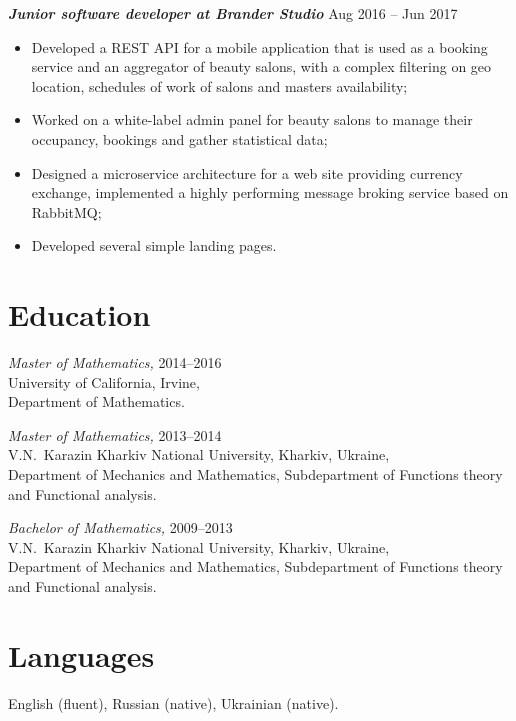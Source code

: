 \documentclass[margin, 10pt]{res} %
\begin{document}
\begin{resume}
{\sl \bf Junior software developer at Brander Studio} \hfill Aug 2016 -- Jun 2017
\begin{itemize}
 \item Developed a REST API  for a mobile application that is used as a booking service and an aggregator of beauty salons, with a complex filtering on geo location, schedules of work of salons and masters availability;
 \item Worked on a white-label admin panel for beauty salons to manage their occupancy, bookings and gather statistical data;
 \item Designed a microservice architecture for a web site providing currency exchange, implemented a highly performing message broking service based on RabbitMQ;
 \item Developed several simple landing pages.
\end{itemize}

\section{Education}
{\sl Master of Mathematics,} \hfill 2014--2016\\
University of California, Irvine, \\
Department of Mathematics.

{\sl Master of Mathematics,} \hfill  2013--2014\\
 V.N.\ Karazin Kharkiv National University, Kharkiv, Ukraine,\\
Department of Mechanics and Mathematics, Subdepartment 
of Functions theory and Functional analysis. 

{\sl Bachelor of Mathematics,} \hfill 2009--2013\\
V.N.\ Karazin Kharkiv National University, Kharkiv, Ukraine,\\
Department of Mechanics and Mathematics, Subdepartment 
of Functions theory and Functional analysis.

\section{Languages}
English (fluent), Russian (native), Ukrainian (native).

\end{resume}
\end{document}

